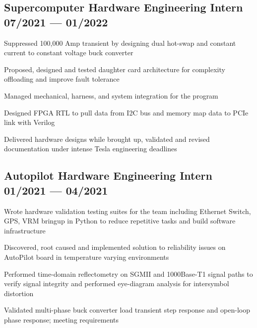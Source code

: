 \documentclass[letter,10pt]{article}
\begin{document}
\subsection{{Supercomputer Hardware Engineering Intern \hfill 07/2021 --- 01/2022}}
\begin{zitemize}
\item Suppressed 100,000 Amp transient by designing dual hot-swap and constant current to constant voltage buck converter
\item Proposed, designed and tested daughter card architecture for complexity offloading and improve fault tolerance
\item Managed mechanical, harness, and system integration for the program
\item Designed FPGA RTL to pull data from I2C bus and memory map data to PCIe link with Verilog
\item Delivered hardware designs while brought up, validated and revised documentation under intense Tesla engineering deadlines
\end{zitemize}

\subsection{{Autopilot Hardware Engineering Intern \hfill 01/2021 --- 04/2021}}
\begin{zitemize}
\item Wrote hardware validation testing suites for the team including Ethernet Switch, GPS, VRM bringup in Python to reduce repetitive tasks and build software infrastructure
\item Discovered, root caused and implemented solution to reliability issues on AutoPilot board in temperature varying environments
\item Performed time-domain reflectometry on SGMII and 1000Base-T1 signal paths to verify signal integrity and performed eye-diagram analysis for intersymbol distortion
\item Validated multi-phase buck converter load transient step response and open-loop phase response; meeting requirements
\end{zitemize}

\end{document}
